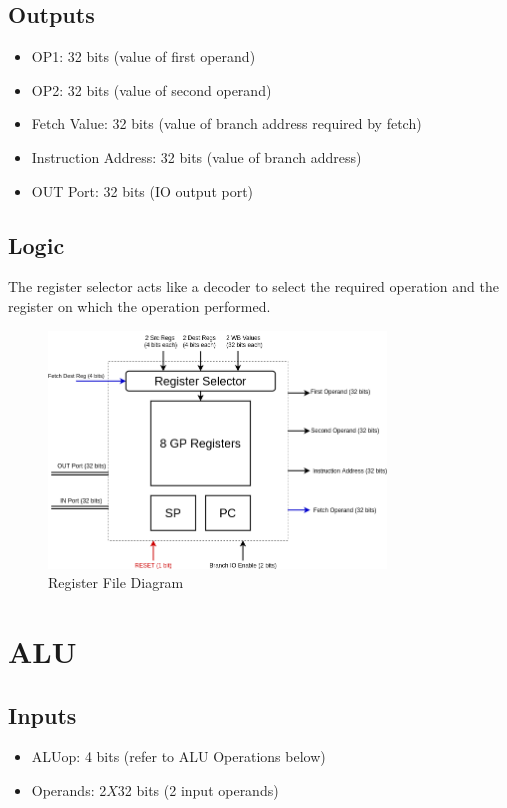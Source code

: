 \documentclass[12pt]{report}
\begin{document}
\subsection{Outputs}
\begin{itemize}
    \item OP1: 32 bits (value of first operand)
    \item OP2: 32 bits (value of second operand)
    \item Fetch Value: 32 bits (value of branch address required by fetch)
    \item Instruction Address: 32 bits (value of branch address)
    \item OUT Port: 32 bits (IO output port)
\end{itemize}

\subsection{Logic}
The register selector acts like a decoder to select the required operation and the register on which the operation performed.

\begin{center}
    \begin{figure}[hp]
        \centering
        \includegraphics[width=0.8\textwidth]{reg_file}
        \caption{Register File Diagram}
        \label{fig:reg_file}
    \end{figure}
\end{center}

\section{ALU}

\subsection{Inputs}
\begin{itemize}
    \item ALUop: 4 bits (refer to ALU Operations below)
    \item Operands: 2$X$32 bits (2 input operands)
\end{itemize}
\end{document}
